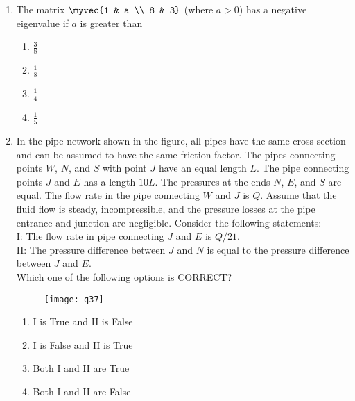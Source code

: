 \documentclass[journal,11pt,onecolumn]{IEEEtran}
\begin{document}
\begin{enumerate}[resume]

    \item The matrix $\myvec{1 & a \\ 8 & 3}$ (where $a > 0$) has a negative eigenvalue if $a$ is greater than

          \begin{enumerate}
              \item $\frac{3}{8}$\vspace{0.5cm}
              \item $\frac{1}{8}$\vspace{0.5cm}
              \item $\frac{1}{4}$\vspace{0.5cm}
              \item $\frac{1}{5}$
          \end{enumerate}

    \item In the pipe network shown in the figure, all pipes have the same cross-section and can be assumed to have the same friction factor. The pipes connecting points $W$, $N$, and $S$ with point $J$ have an equal length $L$. The pipe connecting points $J$ and $E$ has a length $10L$. The pressures at the ends $N$, $E$, and $S$ are equal. The flow rate in the pipe connecting $W$ and $J$ is $Q$. Assume that the fluid flow is steady, incompressible, and the pressure losses at the pipe entrance and junction are negligible. Consider the following statements:\\

          I: The flow rate in pipe connecting $J$ and $E$ is $Q/21$.\\
          II: The pressure difference between $J$ and $N$ is equal to the pressure difference between $J$ and $E$.\\

          Which one of the following options is CORRECT?

          \begin{figure}[H]
              \centering
              \caption{}
              \texttt{[image: q37]}
              \label{fig:q37}
          \end{figure}

          \begin{enumerate}
              \item I is True and II is False
              \item I is False and II is True
              \item Both I and II are True
              \item Both I and II are False
          \end{enumerate}


\end{enumerate}
\end{document}
